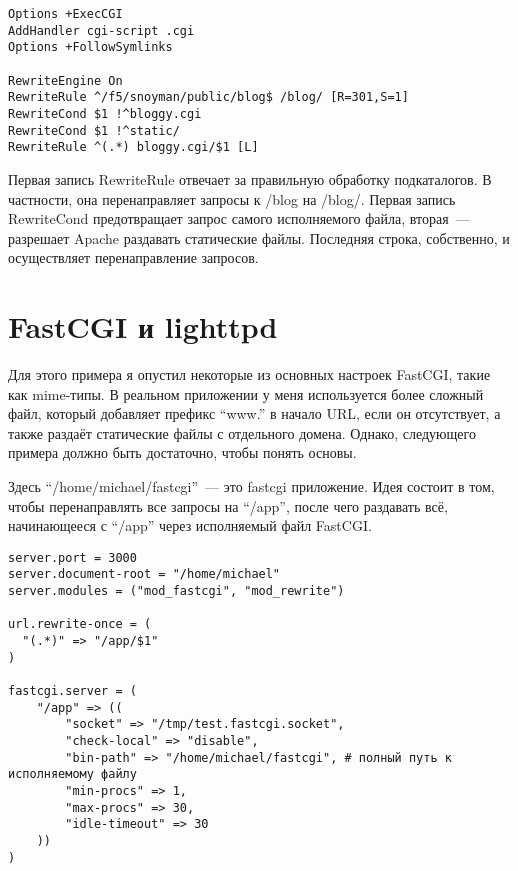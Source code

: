 \begin{lstlisting}
Options +ExecCGI
AddHandler cgi-script .cgi
Options +FollowSymlinks

RewriteEngine On
RewriteRule ^/f5/snoyman/public/blog$ /blog/ [R=301,S=1]
RewriteCond $1 !^bloggy.cgi
RewriteCond $1 !^static/
RewriteRule ^(.*) bloggy.cgi/$1 [L]
\end{lstlisting}
%

Первая запись RewriteRule отвечает за правильную обработку подкаталогов. В частности, она перенаправляет запросы к /blog на /blog/. Первая запись RewriteCond предотвращает запрос самого исполняемого файла, вторая~--- разрешает Apache раздавать статические файлы. Последняя строка, собственно, и осуществляет перенаправление запросов.
%

\section{FastCGI и lighttpd}
%
%

Для этого примера я опустил некоторые из основных настроек FastCGI, такие как mime-типы. В реальном приложении у меня используется более сложный файл, который добавляет префикс ``www.'' в начало URL, если он отсутствует, а также раздаёт статические файлы с отдельного домена. Однако, следующего примера должно быть достаточно, чтобы понять основы.

Здесь ``/home/michael/fastcgi''~--- это fastcgi приложение. Идея состоит в том, чтобы перенаправлять все запросы на ``/app'', после чего раздавать всё, начинающееся с ``/app'' через исполняемый файл FastCGI.
%

\begin{lstlisting}
server.port = 3000
server.document-root = "/home/michael"
server.modules = ("mod_fastcgi", "mod_rewrite")

url.rewrite-once = (
  "(.*)" => "/app/$1"
)

fastcgi.server = (
    "/app" => ((
        "socket" => "/tmp/test.fastcgi.socket",
        "check-local" => "disable",
        "bin-path" => "/home/michael/fastcgi", # полный путь к исполняемому файлу
        "min-procs" => 1,
        "max-procs" => 30,
        "idle-timeout" => 30
    ))
)
\end{lstlisting}

